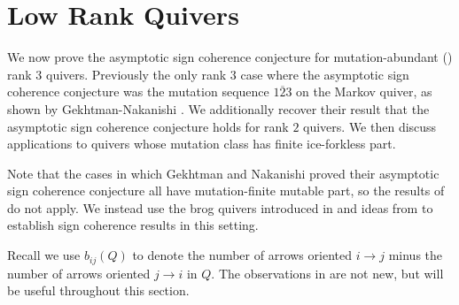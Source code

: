 \documentclass[12pt]{amsart}
\theoremstyle{definition}
\theoremstyle{remark}
\numberwithin{equation}{section}
\begin{document}
\section{Low Rank Quivers}
\label{sec:low rank}

We now prove the asymptotic sign coherence conjecture for mutation-abundant () rank $3$ quivers.  Previously the only rank $3$ case where the asymptotic sign coherence conjecture was the mutation sequence $\overline{123}$ on the Markov quiver, as shown by Gekhtman-Nakanishi \cite[Section 4]{GekhtmanNakanishi}.  We additionally recover their result that the asymptotic sign coherence conjecture holds for rank $2$ quivers.  We then discuss applications to quivers whose mutation class has finite ice-forkless part.

Note that the cases in which Gekhtman and Nakanishi proved their asymptotic sign coherence conjecture all have mutation-finite mutable part, so the results of  do not apply. We instead use the brog quivers introduced in  and ideas from  to establish sign coherence results in this setting.  

Recall we use $b_{ij}(Q)$ to denote the number of arrows oriented $i \rightarrow j$ minus the number of arrows oriented $j \rightarrow i$ in $Q$.
The observations in  are not new, but will be useful throughout this section. 
\end{document}
